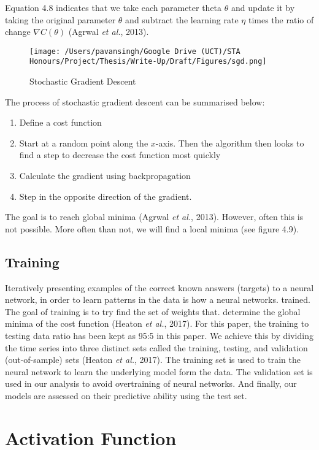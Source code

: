 Equation 4.8 indicates that we take each parameter theta $\theta$ and update it by taking the original parameter $\theta$ and subtract the learning rate $\eta$ times the ratio of change $\nabla C(\theta)$ (Agrwal \textit{et al.}, 2013).

\begin{figure}[h]
\centering
  \texttt{[image: /Users/pavansingh/Google Drive (UCT)/STA Honours/Project/Thesis/Write-Up/Draft/Figures/sgd.png]}
  \caption{Stochastic Gradient Descent}
  \label{}
\end{figure}

The process of stochastic gradient descent can be summarised below:
\begin{enumerate}
\item Define a cost function
\item Start at a random point along the $x$-axis. Then the algorithm then looks to find a step to decrease the cost function most quickly
\item Calculate the gradient using backpropagation
\item Step in the opposite direction of the gradient. 
\end{enumerate}

The goal is to reach global minima (Agrwal \textit{et al.}, 2013).  However, often this is not possible. More often than not, we will find a local minima (see figure 4.9).

\subsection{Training}

Iteratively presenting examples of the correct known answers (targets) to a neural network, in order to learn patterns in the data is how a neural networks. trained. The goal of training is to try find the set of weights that. determine the global minima of the cost function (Heaton \textit{et al.}, 2017). For this paper, the training to testing data ratio has been kept as 95:5 in this paper. We achieve this by dividing the time series into three distinct sets called the training, testing, and validation (out-of-sample) sets (Heaton \textit{et al.}, 2017).  The training set is used to train the neural network to learn the underlying model form the data.  The validation set is used in our analysis to avoid overtraining of neural networks. And finally, our models are assessed on their predictive ability using the test set. 

\section{Activation Function}


